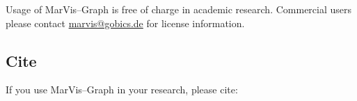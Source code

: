 \documentclass[titlepage,a4paper,twoside]{article}
\newcommand{\mg}{MarVis--Graph\xspace}
\begin{document}
Usage of \mg is free of charge in academic research. Commercial users please
contact \href{mailto:marvis@gobics.de}{marvis@gobics.de} for license
information.

\subsection{Cite}

If you use \mg in your research, please cite:
\cite{landesfeind2013marvisgraph}




\end{document}

